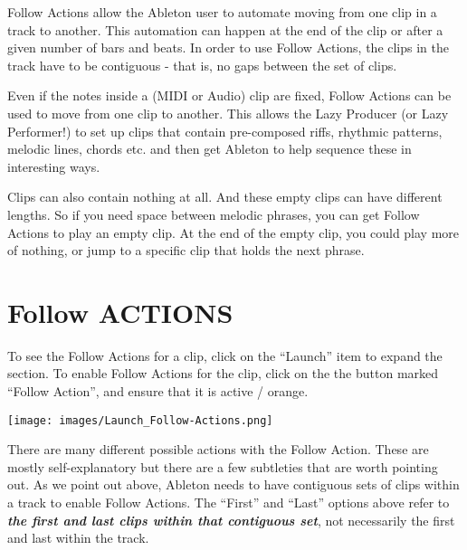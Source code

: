 \documentclass[
  12pt,
  letterpaper,
  oneside,
  open=any]{scrbook}
\begin{document}
\begin{tcolorbox}[enhanced jigsaw, arc=.35mm, title=\textcolor{quarto-callout-tip-color}{\faLightbulb}\hspace{0.5em}{Key idea}, colback=white, opacitybacktitle=0.6, coltitle=black, toptitle=1mm, colframe=quarto-callout-tip-color-frame, bottomtitle=1mm, titlerule=0mm, rightrule=.15mm, bottomrule=.15mm, colbacktitle=quarto-callout-tip-color!10!white, toprule=.15mm, breakable, opacityback=0, left=2mm, leftrule=.75mm]

Follow Actions allow the Ableton user to automate moving from one clip
in a track to another. This automation can happen at the end of the clip
or after a given number of bars and beats. In order to use Follow
Actions, the clips in the track have to be contiguous - that is, no gaps
between the set of clips.

Even if the notes inside a (MIDI or Audio) clip are fixed, Follow
Actions can be used to move from one clip to another. This allows the
Lazy Producer (or Lazy Performer!) to set up clips that contain
pre-composed riffs, rhythmic patterns, melodic lines, chords etc. and
then get Ableton to help sequence these in interesting ways.

Clips can also contain nothing at all. And these empty clips can have
different lengths. So if you need space between melodic phrases, you can
get Follow Actions to play an empty clip. At the end of the empty clip,
you could play more of nothing, or jump to a specific clip that holds
the next phrase.

\end{tcolorbox}

\section{Follow ACTIONS}\label{follow-actions}

To see the Follow Actions for a clip, click on the ``Launch'' item to
expand the section. To enable Follow Actions for the clip, click on the
the button marked ``Follow Action'', and ensure that it is active /
orange.

\texttt{[image: images/Launch\_Follow-Actions.png]}

There are many different possible actions with the Follow Action. These
are mostly self-explanatory but there are a few subtleties that are
worth pointing out. As we point out above, Ableton needs to have
contiguous sets of clips within a track to enable Follow Actions. The
``First'' and ``Last'' options above refer to \textbf{\emph{the first
and last clips within that contiguous set}}, not necessarily the first
and last within the track.
\end{document}
